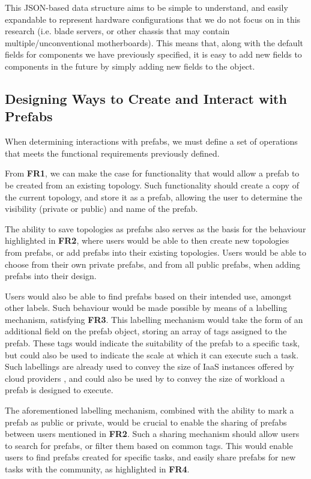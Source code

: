 \documentclass[11pt]{article}
\begin{document}
		This JSON-based data structure aims to be simple to understand, and easily expandable to represent hardware configurations that we do not focus on in this research (i.e. blade servers, or other chassis that may contain multiple/unconventional motherboards).
		This means that, along with the default fields for components we have previously specified, it is easy to add new fields to components in the future by simply adding new fields to the object.


	\subsection{Designing Ways to Create and Interact with Prefabs}
		When determining interactions with prefabs, we must define a set of operations that meets the functional requirements previously defined.
		
		From \textbf{FR1}, we can make the case for functionality that would allow a prefab to be created from an existing topology.
		Such functionality should create a copy of the current topology, and store it as a prefab, allowing the user to determine the visibility (private or public) and name of the prefab.

		The ability to save topologies as prefabs also serves as the basis for the behaviour highlighted in \textbf{FR2}, where users would be able to then create new topologies from prefabs, or add prefabs into their existing topologies.
		Users would be able to choose from their own private prefabs, and from all public prefabs, when adding prefabs into their design.

		Users would also be able to find prefabs based on their intended use, amongst other labels. 
		Such behaviour would be made possible by means of a labelling mechanism, satisfying \textbf{FR3}.
		This labelling mechanism would take the form of an additional field on the prefab object, storing an array of tags assigned to the prefab.
		These tags would indicate the suitability of the prefab to a specific task, but could also be used to indicate the scale at which it can execute such a task.
		Such labellings are already used to convey the size of IaaS instances offered by cloud providers \cite{davatz2017}, and could also be used by \opendc{} to convey the size of workload a prefab is designed to execute.

		The aforementioned labelling mechanism, combined with the ability to mark a prefab as public or private, would be crucial to enable the sharing of prefabs between users mentioned in \textbf{FR2}.
		Such a sharing mechanism should allow users to search for prefabs, or filter them based on common tags.
		This would enable users to find prefabs created for specific tasks, and easily share prefabs for new tasks with the community, as highlighted in \textbf{FR4}.
\end{document}
